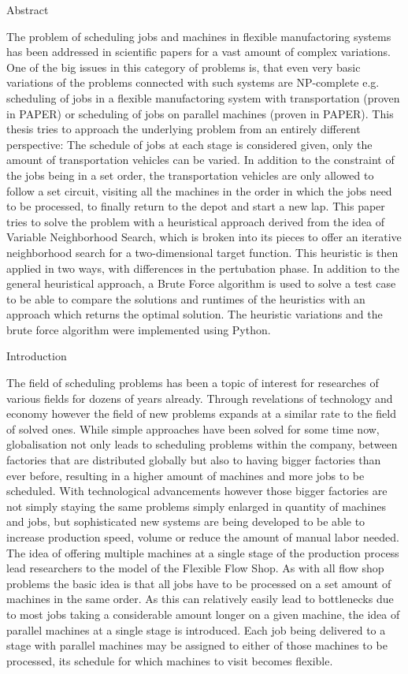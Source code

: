 Abstract

The problem of scheduling jobs and machines in flexible manufactoring systems has been addressed in scientific papers
for a vast amount of complex variations. One of the big issues in this category of problems is, that even very basic
variations of the problems connected with such systems are NP-complete e.g. scheduling of jobs in a flexible manufactoring
system with transportation (proven in PAPER) or scheduling of jobs on parallel machines (proven in PAPER). This thesis
tries to approach the underlying problem from an entirely different perspective: The schedule of jobs at each stage is considered
given, only the amount of transportation vehicles can be varied. In addition to the constraint of the jobs being in a set order, the
transportation vehicles are only allowed to follow a set circuit, visiting all the machines in the order in which the
jobs need to be processed, to finally return to the depot and start a new lap. This paper tries to solve the problem with
a heuristical approach derived from the idea of Variable Neighborhood Search, which is broken into its pieces to offer
an iterative neighborhood search for a two-dimensional target function. This heuristic is then applied in two ways, with
differences in the pertubation phase. In addition to the general heuristical approach, a Brute Force algorithm is used to
solve a test case to be able to compare the solutions and runtimes of the heuristics with an approach which returns the optimal
solution. The heuristic variations and the brute force algorithm were implemented using Python.

Introduction

The field of scheduling problems has been a topic of interest for researches of various fields for dozens of years already. Through
revelations of technology and economy however the field of new problems expands at a similar rate to the field of solved ones. While simple
approaches have been solved for some time now, globalisation not only leads to scheduling problems within the company, between factories 
that are distributed globally but also to having bigger factories than ever before, resulting in a higher amount of machines and more jobs
to be scheduled. With technological advancements however those bigger factories are not simply staying the same problems simply enlarged in
quantity of machines and jobs, but sophisticated new systems are being developed to be able to increase production speed, volume or reduce
the amount of manual labor needed. The idea of offering multiple machines at a single stage of the production process lead researchers to the
model of the Flexible Flow Shop. As with all flow shop problems the basic idea is that all jobs have to be processed on a set amount of machines in
the same order. As this can relatively easily lead to bottlenecks due to most jobs taking a considerable amount longer on a given machine, the idea
of parallel machines at a single stage is introduced. Each job being delivered to a stage with parallel machines may be assigned to either of
those machines to be processed, its schedule for which machines to visit becomes flexible. 


